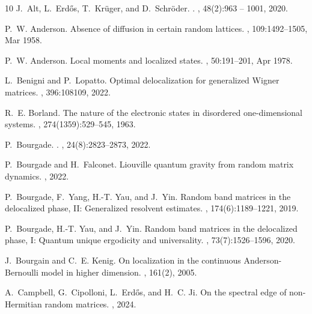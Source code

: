 \documentclass[10pt,reqno]{amsart}
\numberwithin{equation}{section}
\numberwithin{figure}{section}
\theoremstyle{plain} %
\theoremstyle{definition} %
\numberwithin{equation}{section}
\begin{document}
\begin{thebibliography}{10}
	J.~Alt, L.~Erdős, T.~Kr{\"u}ger, and D.~Schr{\"o}der.
	.
	, 48(2):963 -- 1001, 2020.
	
	P.~W. Anderson.
	\newblock Absence of diffusion in certain random lattices.
	, 109:1492--1505, Mar 1958.
	
	P.~W. Anderson.
	\newblock Local moments and localized states.
	, 50:191--201, Apr 1978.
	
	L.~Benigni and P.~Lopatto.
	\newblock Optimal delocalization for generalized {W}igner matrices.
	, 396:108109, 2022.
	
	R.~E. Borland.
	\newblock The nature of the electronic states in disordered one-dimensional
	systems.
	, 274(1359):529--545, 1963.
	
	P.~Bourgade.
	.
	, 24(8):2823--2873,
	2022.
	
	P.~Bourgade and H.~Falconet.
	\newblock Liouville quantum gravity from random matrix dynamics.
	, 2022.
	
	P.~Bourgade, F.~Yang, H.-T. Yau, and J.~Yin.
	\newblock Random band matrices in the delocalized phase, {II}: Generalized
	resolvent estimates.
	, 174(6):1189--1221, 2019.
	
	P.~Bourgade, H.-T. Yau, and J.~Yin.
	\newblock Random band matrices in the delocalized phase, {I}: Quantum unique
	ergodicity and universality.
	,
	73(7):1526--1596, 2020.
	
	J.~Bourgain and C.~E. Kenig.
	\newblock On localization in the continuous {Anderson-Bernoulli} model in
	higher dimension.
	, 161(2), 2005.
	
	A.~Campbell, G.~Cipolloni, L.~Erdős, and H.~C. Ji.
	\newblock On the spectral edge of non-{H}ermitian random matrices.
	, 2024.
	

\end{thebibliography}
\end{document}
